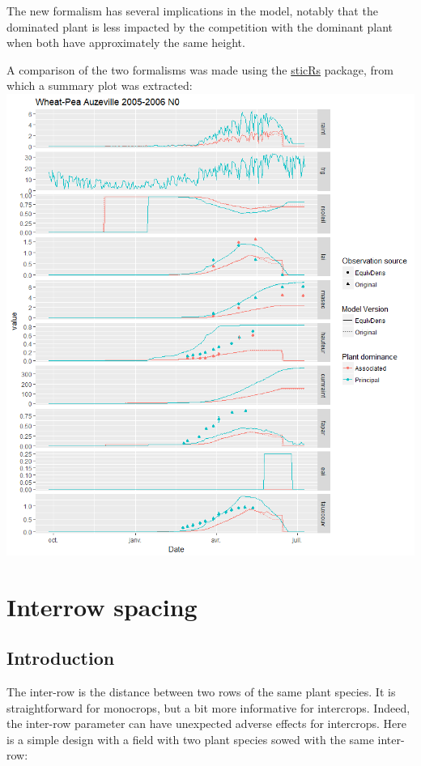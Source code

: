 \documentclass[]{book}
\theoremstyle{definition}
\theoremstyle{definition}
\theoremstyle{definition}
\theoremstyle{remark}
\begin{document}
The new formalism has several implications in the model, notably that
the dominated plant is less impacted by the competition with the
dominant plant when both have approximately the same height.

A comparison of the two formalisms was made using the
\href{https://github.com/VEZY/sticRs}{sticRs} package, from which a
summary plot was extracted:
\includegraphics{img/Equ-dens-computation.png}

\chapter{Interrow spacing}\label{interrow-spacing}

\section{Introduction}\label{introduction-2}

The inter-row is the distance between two rows of the same plant
species. It is straightforward for monocrops, but a bit more informative
for intercrops. Indeed, the inter-row parameter can have unexpected
adverse effects for intercrops. Here is a simple design with a field
with two plant species sowed with the same inter-row:
\end{document}
